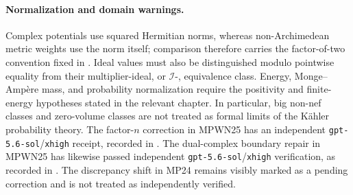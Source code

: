 \paragraph{Normalization and domain warnings.}
\label{front:part5-normalization-and-domain-warnings}
Complex potentials use squared Hermitian norms, whereas non-Archimedean
metric weights use the norm itself; comparison therefore carries the
factor-of-two convention fixed in .  Ideal values
must also be distinguished modulo pointwise equality from their
multiplier-ideal, or \(\mathcal I\)-, equivalence class.  Energy,
Monge--Amp\`ere mass, and probability normalization require the positivity
and finite-energy hypotheses stated in the relevant chapter.  In particular,
big non-nef classes and zero-volume classes are not treated as formal limits
of the K\"ahler probability theory.  The factor-\(n\) correction in MPWN25
has an independent \texttt{gpt-5.6-sol}/\texttt{xhigh} receipt, recorded in
.  The dual-complex boundary
repair in MPWN25 has likewise passed independent
\texttt{gpt-5.6-sol}/\texttt{xhigh} verification, as recorded in
.  The discrepancy shift in MP24 remains
visibly marked as a pending correction and is not treated as independently
verified.
